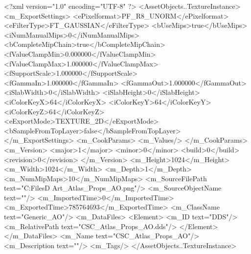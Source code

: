 <?xml version="1.0" encoding="UTF-8" ?>
<AssetObjects..TextureInstance>
	<m_ExportSettings>
		<ePixelformat>PF_R8_UNORM</ePixelformat>
		<eFilterType>FT_GAUSSIAN</eFilterType>
		<bUseMips>true</bUseMips>
		<iNumManualMips>0</iNumManualMips>
		<bCompleteMipChain>true</bCompleteMipChain>
		<fValueClampMin>0.000000</fValueClampMin>
		<fValueClampMax>1.000000</fValueClampMax>
		<fSupportScale>1.000000</fSupportScale>
		<fGammaIn>1.000000</fGammaIn>
		<fGammaOut>1.000000</fGammaOut>
		<iSlabWidth>0</iSlabWidth>
		<iSlabHeight>0</iSlabHeight>
		<iColorKeyX>64</iColorKeyX>
		<iColorKeyY>64</iColorKeyY>
		<iColorKeyZ>64</iColorKeyZ>
		<eExportMode>TEXTURE_2D</eExportMode>
		<bSampleFromTopLayer>false</bSampleFromTopLayer>
	</m_ExportSettings>
	<m_CookParams>
		<m_Values/>
	</m_CookParams>
	<m_Version>
		<major>1</major>
		<minor>0</minor>
		<build>0</build>
		<revision>0</revision>
	</m_Version>
	<m_Height>1024</m_Height>
	<m_Width>1024</m_Width>
	<m_Depth>1</m_Depth>
	<m_NumMipMaps>10</m_NumMipMaps>
	<m_SourceFilePath text="C:\Users\Shadow\Desktop\Working Files\3D Art\Textures\CSC_Atlas_Props_AO.png"/>
	<m_SourceObjectName text=""/>
	<m_ImportedTime>0</m_ImportedTime>
	<m_ExportedTime>785764693</m_ExportedTime>
	<m_ClassName text="Generic_AO"/>
	<m_DataFiles>
		<Element>
			<m_ID text="DDS"/>
			<m_RelativePath text="CSC_Atlas_Props_AO.dds"/>
		</Element>
	</m_DataFiles>
	<m_Name text="CSC_Atlas_Props_AO"/>
	<m_Description text=""/>
	<m_Tags/>
</AssetObjects..TextureInstance>

